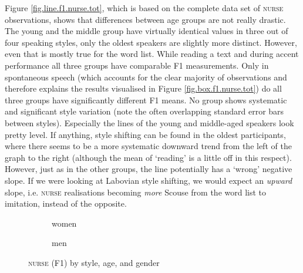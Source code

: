 Figure \ref{fig.line.f1.nurse.tot}, which is based on the complete data set of \textsc{nurse} observations, shows that differences between age groups are not really drastic.
The young and the middle group have virtually identical values in three out of four speaking styles, only the oldest speakers are slightly more distinct.
However, even that is mostly true for the word list.
While reading a text and during accent performance all three groups have comparable F1 measurements.
Only in spontaneous speech (which accounts for the clear majority of observations and therefore explains the results visualised in Figure \ref{fig.box.f1.nurse.tot}) do all three groups have significantly different F1 means.
No group shows systematic and significant style variation (note the often overlapping standard error bars between styles).
Especially the lines of the young and middle-aged speakers look pretty level.
If anything, style shifting can be found in the oldest participants, where there seems to be a more systematic downward trend from the left of the graph to the right (although the mean of `reading' is a little off in this respect).
However, just as in the other groups, the line potentially has a `wrong' negative slope.
If we were looking at Labovian style shifting, we would expect an \emph{upward} slope, i.e. \textsc{nurse} realisations becoming \emph{more} Scouse from the word list to imitation, instead of the opposite.

\begin{figure}[h!]
	\centering
	\begin{subfigure}{.49\textwidth}
		\centering
			\resizebox{\linewidth}{!}{} 
		\caption{women}
		\label{fig.line.f1.nurse.women}
	\end{subfigure}
	\begin{subfigure}{.49\textwidth}
		\centering
			\resizebox{\linewidth}{!}{} 
		\caption{men}
		\label{fig.line.f1.nurse.men}
	\end{subfigure}
	\caption{\textsc{nurse} (F1) by style, age, and gender}
\end{figure}

